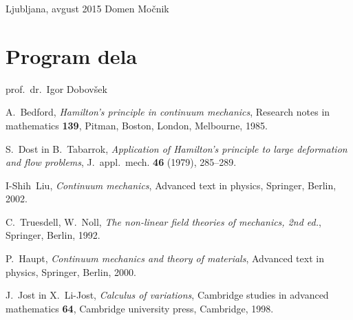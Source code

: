 \documentclass[12pt,a4paper]{report}
\begin{document}
\null

\noindent Ljubljana, avgust 2015 \hfill Domen Močnik
\pagebreak



\tableofcontents
\pagebreak



\chapter*{Program dela}


\null

\noindent prof.~dr.~Igor Dobovšek
\pagebreak




\pagebreak












\begin{thebibliography}{99}

A.~Bedford, \emph{Hamilton's principle in continuum mechanics}, Research notes in mathematics {\bf 139},
Pitman, Boston, London, Melbourne, 1985.

S.~Dost in B.~Tabarrok, \emph{Application of Hamilton's principle to large deformation and flow problems},
J.~appl.~mech. {\bf 46} (1979), 285--289.

I-Shih~Liu, \emph{Continuum mechanics}, Advanced text in physics,
Springer, Berlin, 2002.

C.~Truesdell, W.~Noll, \emph{The non-linear field theories of mechanics, 2nd ed.},
Springer, Berlin, 1992.

P.~Haupt, \emph{Continuum mechanics and theory of materials}, Advanced text in physics,
Springer, Berlin, 2000.

J.~Jost in X.~Li-Jost, \emph{Calculus of variations}, Cambridge studies in advanced mathematics {\bf 64},
Cambridge university press, Cambridge, 1998.

\end{thebibliography}
\end{document}
